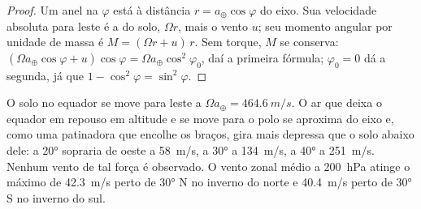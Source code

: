 \begin{proof}
Um anel na  $\varphi$ está à distância $r = a_\oplus\cos\varphi$ do eixo. Sua velocidade
absoluta para leste é a do solo, $\Omega r$, mais o vento $u$; seu momento angular por unidade de
massa é $M = (\Omega r + u)\,r$. Sem torque, $M$ se conserva: $(\Omega a_\oplus\cos\varphi + u)\cos\varphi = \Omega a_\oplus
\cos^2\varphi_0$, daí a primeira fórmula; $\varphi_0 = 0$ dá a segunda, já que $1 - \cos^2\varphi = \sin^2\varphi$.
\end{proof}

O solo no equador se move para leste a $\Omega a_\oplus = \qty{464.6}{m/s}$. O ar que deixa o equador
em repouso em altitude e se move para o polo se aproxima do eixo e, como uma patinadora que encolhe os
braços, gira mais depressa que o solo abaixo dele: a \ang{20} sopraria de oeste a \qty{58}{m/s}, a
\ang{30} a \qty{134}{m/s}, a \ang{40} a \qty{251}{m/s}. Nenhum vento de tal força é observado. O vento
zonal médio a \qty{200}{hPa} atinge o máximo de \qty{42.3}{m/s} perto de \ang{30} N no inverno do norte
e \qty{40.4}{m/s} perto de \ang{30} S no inverno do sul.

